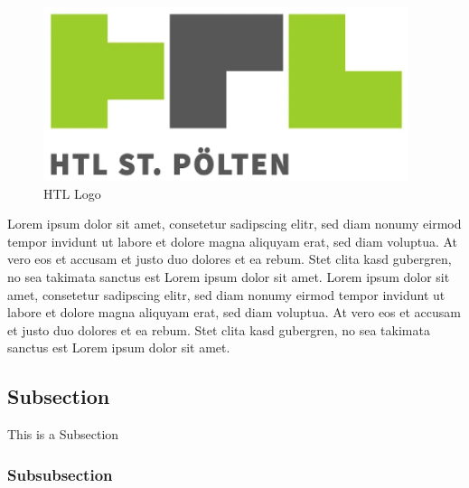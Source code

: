\documentclass[12pt]{article}
\begin{document}
\begin{figure}[h]                                                                           %
    \centering
    \includegraphics[scale=0.25]{./img/HTL.png}                                             %
    \caption{HTL Logo\cite{picture_HTL.png}}                                                    %
    \label{fig:figure1}                                                                     %
\end{figure}

Lorem ipsum dolor sit amet, consetetur sadipscing elitr, sed diam nonumy eirmod tempor invidunt ut labore et dolore magna 
aliquyam erat, sed diam voluptua. At vero eos et accusam et justo duo dolores et ea rebum. Stet clita kasd gubergren, no 
sea takimata sanctus est Lorem ipsum dolor sit amet. Lorem ipsum dolor sit amet, consetetur sadipscing elitr, sed diam nonumy 
eirmod tempor invidunt ut labore et dolore magna aliquyam erat, sed diam voluptua. At vero eos et accusam et justo duo dolores 
et ea rebum. Stet clita kasd gubergren, no sea takimata sanctus est Lorem ipsum dolor sit amet. \cite{Lorem1}


\clearpage




\subsection{Subsection}

\par 
This is a Subsection



\subsubsection{Subsubsection}
\end{document}
